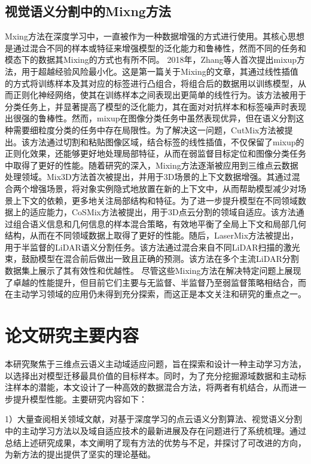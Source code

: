 \subsection{视觉语义分割中的Mixng方法}
Mxing方法在深度学习中，一直被作为一种数据增强的方式进行使用。其核心思想是通过混合不同的样本或特征来增强模型的泛化能力和鲁棒性，然而不同的任务和模态下的数据其Mixing的方式也有所不同。
2018年，Zhang等人首次提出mixup方法，用于超越经验风险最小化。这是第一篇关于Mixing的文章，其通过线性插值的方式将训练样本及其对应的标签进行凸组合，将组合后的数据用以训练模型，从而正则化神经网络，使其在训练样本之间表现出更简单的线性行为。该方法被用于分类任务上，并显著提高了模型的泛化能力，其在面对对抗样本和标签噪声时表现出很强的鲁棒性。然而，mixup在图像分类任务中虽然表现优异，但在语义分割这种需要细粒度分类的任务中存在局限性。为了解决这一问题，CutMix方法被提出。该方法通过切割和粘贴图像区域，结合标签的线性插值，不仅保留了mixup的正则化效果，还能够更好地处理局部特征，从而在弱监督目标定位和图像分类任务中取得了更好的性能。随着研究的深入，Mixing方法逐渐被应用到三维点云数据处理领域。Mix3D方法首次被提出，并用于3D场景的上下文数据增强。其通过混合两个增强场景，将对象实例隐式地放置在新的上下文中，从而帮助模型减少对场景上下文的依赖，更多地关注局部结构和特征。为了进一步提升模型在不同领域数据上的适应能力，CoSMix方法被提出，用于3D点云分割的领域自适应。该方法通过组合语义信息和几何信息的样本混合策略，有效地平衡了全局上下文和局部几何结构，从而在不同领域数据上取得了更好的性能。随后，LaserMix方法被提出，用于半监督的LiDAR语义分割任务。该方法通过混合来自不同LiDAR扫描的激光束，鼓励模型在混合前后做出一致且正确的预测。该方法在多个主流LiDAR分割数据集上展示了其有效性和优越性。
尽管这些Mixing方法在解决特定问题上展现了卓越的性能提升，但目前它们主要与无监督、半监督乃至弱监督策略相结合，而在主动学习领域的应用仍未得到充分探索，而这正是本文关注和研究的重点之一。

\section{论文研究主要内容}
本研究聚焦于三维点云语义主动域适应问题，旨在探索和设计一种主动学习方法，以选择出对模型迁移最具价值的目标样本。同时，为了充分挖掘源域数据和主动标注样本的潜能，本文设计了一种高效的数据混合方法，将两者有机结合，从而进一步提升模型性能。主要研究内容如下：

1）大量查阅相关领域文献，对基于深度学习的点云语义分割算法、视觉语义分割中的主动学习方法以及域自适应技术的最新进展及存在问题进行了系统梳理。通过总结上述研究成果，本文阐明了现有方法的优势与不足，并探讨了可改进的方向，为新方法的提出提供了坚实的理论基础。

